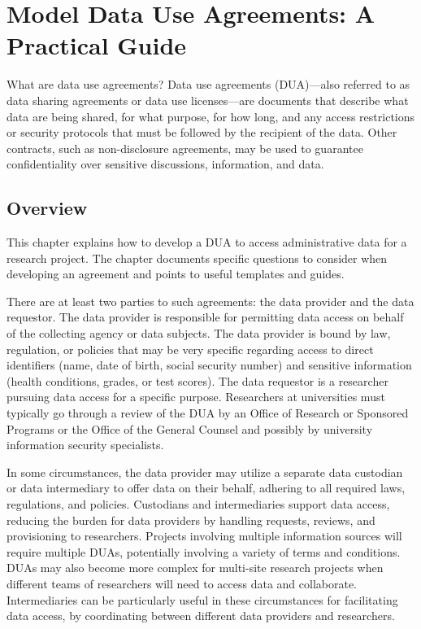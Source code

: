 \hypertarget{dua}{%
\chapter{Model Data Use Agreements: A Practical Guide}\label{dua}}

\hrulefill

What are data use agreements? Data use agreements (DUA)---also referred to as data sharing agreements or data use licenses---are documents that describe what data are being shared, for what purpose, for how long, and any access restrictions or security protocols that must be followed by the recipient of the data. Other contracts, such as non-disclosure agreements, may be used to guarantee confidentiality over sensitive discussions, information, and data.

\hypertarget{overview}{%
\section{Overview}\label{overview}}

This chapter explains how to develop a DUA to access administrative data for a research project. The chapter documents specific questions to consider when developing an agreement and points to useful templates and guides.

There are at least two parties to such agreements: the data provider and the data requestor. The data provider is responsible for permitting data access on behalf of the collecting agency or data subjects. The data provider is bound by law, regulation, or policies that may be very specific regarding access to direct identifiers (name, date of birth, social security number) and sensitive information (health conditions, grades, or test scores). The data requestor is a researcher pursuing data access for a specific purpose. Researchers at universities must typically go through a review of the DUA by an Office of Research or Sponsored Programs or the Office of the General Counsel and possibly by university information security specialists.

In some circumstances, the data provider may utilize a separate data custodian or data intermediary to offer data on their behalf, adhering to all required laws, regulations, and policies. Custodians and intermediaries support data access, reducing the burden for data providers by handling requests, reviews, and provisioning to researchers. Projects involving multiple information sources will require multiple DUAs, potentially involving a variety of terms and conditions. DUAs may also become more complex for multi-site research projects when different teams of researchers will need to access data and collaborate. Intermediaries can be particularly useful in these circumstances for facilitating data access, by coordinating between different data providers and researchers.

